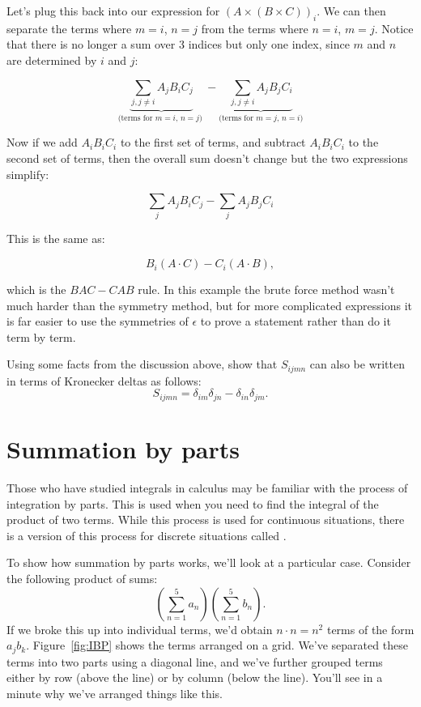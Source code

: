 Let's plug this back into our expression for $ \left( A \times (B \times C) \right)_i$. We can then separate the terms where $m=i$, $n=j$ from the terms where $n=i$, $m=j$. Notice that there is no longer a sum over 3 indices but 
only one index, since $m$ and $n$ are determined by $i$ and $j$:

\[ \underbrace{\sum_{j, j \neq i}  A_j B_i C_j}_{\text{(terms for $m=i$, $n=j$) }}    -  \underbrace{ \sum_{j, j \neq i}   A_j B_j C_i}_{\text{(terms for $m=j$, $n=i$)}} \] 
	                         	  


Now if we add $A_i B_i C_i$ to the first set of terms, and subtract $A_i B_i C_i$ to the second set of terms, then the overall sum doesn't change but the two 
expressions simplify:

\[ \sum_{j}  A_j B_i C_j    -  \sum_{j}   A_j B_j C_i  \]

This is the same as:

\[ B_i  (A \cdot C) - C_i (A \cdot B), \]

which is the $BAC-CAB$ rule.  In this example the brute force method wasn't much harder than the symmetry method, but for more complicated expressions it is far easier to use the symmetries of $\epsilon$ to prove a statement rather than do it term by term.

\begin{exercise}{}
Using some facts from the discussion above, show that  $S_{ijmn}$ can also be written in terms of Kronecker deltas as follows:
\[S_{ijmn} = \delta_{im} \delta_{jn} - \delta_{in} \delta_{jm}. \]
\end{exercise}

\section{Summation by parts}

Those who have studied integrals in calculus may be familiar with the process of integration by parts.  This is used when you need to find the integral of the product of two terms.  While this process is used for continuous situations, there is a version of this process for discrete situations called .  

To show how summation by parts works, we'll look at a particular case. Consider the following product of sums:
\[\left( \sum_{n=1}^{5}a_{n} \right) \left( \sum_{n=1}^{5}b_{n} \right). \] 
If we broke this up into individual terms, we'd obtain $n \cdot n = n^2$ terms of the form $a_j b_k$.  Figure~\ref{fig:IBP}
shows the terms arranged on a grid. We've separated these terms into two parts using  a diagonal line, and we've further
grouped terms either by row (above the line) or by column (below the line). You'll see in a minute why we've arranged things like this.

